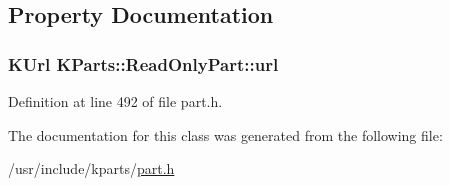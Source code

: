 \subsection{\-Property \-Documentation}
\hypertarget{classKParts_1_1ReadOnlyPart_a5b8edbf05a338814287496882adde559}{
\subsubsection[{url}]{\setlength{\rightskip}{0pt plus 5cm}\-K\-Url {\bf \-K\-Parts\-::\-Read\-Only\-Part\-::url}}}\label{classKParts_1_1ReadOnlyPart_a5b8edbf05a338814287496882adde559}


\-Definition at line 492 of file part.\-h.



\-The documentation for this class was generated from the following file\-:\begin{DoxyCompactItemize}
\item 
/usr/include/kparts/\hyperlink{part_8h}{part.\-h}\end{DoxyCompactItemize}
